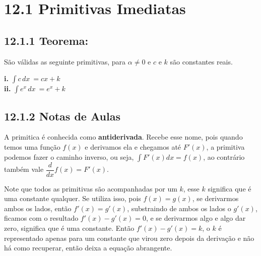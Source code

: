 \documentclass[article,12pt,oneside,a4paper,brazil]{abntex2}
\begin{document}
	\section*{12.1 Primitivas Imediatas}
	
	\subsection*{12.1.1 Teorema: }
	
	\begin{flushleft}	
		São válidas as seguinte primitivas, para $\alpha \neq  0$ e $c$ e $k$ são constantes reais.
		
		\textbf{i. }  $\int c \,dx\ = cx + k$ \\ [1em]
		\textbf{ii. } $\int e^x \,dx\ = e^x + k$ \\ [1em]
	\end{flushleft}
	
	\subsection*{12.1.2 Notas de Aulas}
	
	\begin{flushleft}
		A primitica é conhecida como \textbf{antiderivada}. Recebe esse nome, pois quando temos uma função $f(x)$ e derivamos ela e chegamos até $F'(x)$, a primitiva podemos fazer o caminho inverso, ou seja, $\int F'(x) dx = f(x)$, ao contrário também vale $\dfrac{d}{dx}f(x) = F'(x)$. 
		
		Note que todos as primitivas são acompanhadas por um $k$, esse $k$ significa que é uma constante qualquer. Se utiliza isso, pois $f(x) = g(x)$, se derivarmos ambos os lados, então $f'(x) = g'(x)$, substraindo de ambos os lados o $g'(x)$, ficamos com o resultado $f'(x) - g'(x) = 0$, e se derivarmos algo e algo dar zero, significa que é uma constante. Então $f'(x) - g'(x) = k$, o $k$ é representado apenas para um constante que virou zero depois da derivação e não há como recuperar, então deixa a equação abrangente.
	\end{flushleft}
	
\end{document}
